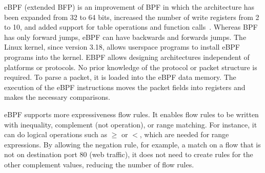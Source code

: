 eBPF (extended BFP) is an improvement of BPF in which the architecture has been expanded from 32 to 64 bits, increased the number of write registers from 2 to 10, and added support for table operations and function calls~\cite{eBPF}.
Whereas BPF has only forward jumps, eBPF can have backwards and forwards jumps.
The Linux kernel, since version 3.18, allows userspace programs to install eBPF programs into the kernel. 
EBPF allows designing architectures independent of platforms or protocols.
No prior knowledge of the protocol or packet structure is required. 
To parse a packet, it is loaded into the eBPF data memory. The execution of the eBPF instructions moves the packet fields into registers and makes the necessary comparisons.

eBPF supports more expressiveness flow rules.
It enables flow rules to be written with inequality, complement (not operation), or range matching. 
For instance, it can do logical operations such as $\geq$ or $<$, which are needed for range expressions. 
By allowing the negation rule, for example, a match on a flow that is not on destination port 80 (web traffic), it does not need to create rules for the other complement values, reducing the number of flow rules. 

